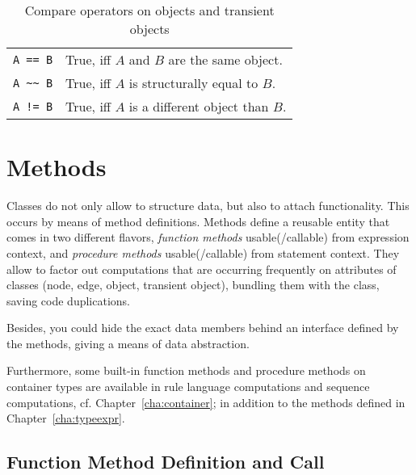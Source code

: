 \begin{table}[htbp]
  \centering
  \begin{tabularx}{\linewidth}{|l|X|}
    \hline
    \texttt{A == B} & True, iff $A$ and $B$ are the same object. \\
    \texttt{A \textasciitilde\textasciitilde\ B} & True, iff $A$ is structurally equal to $B$. \\
    \texttt{A != B} & True, iff $A$ is a different object than $B$. \\
    \hline
  \end{tabularx}
  \caption{Compare operators on objects and transient objects}
  \label{compandarithmetic}
\end{table}


\section{Methods}\label{sec:objectoriented}

Classes do not only allow to structure data, but also to attach functionality.
This occurs by means of method definitions.
Methods define a reusable entity that comes in two different flavors, \emph{function methods} usable(/callable) from expression context, and \emph{procedure methods} usable(/callable) from statement context.
They allow to factor out computations that are occurring frequently on attributes of classes (node, edge, object, transient object), bundling them with the class, saving code duplications. 

Besides, you could hide the exact data members behind an interface defined by the methods, giving a means of data abstraction.

Furthermore, some built-in function methods and procedure methods on container types are available in rule language computations and sequence computations, cf. Chapter~\ref{cha:container};
in addition to the methods defined in Chapter~\ref{cha:typeexpr}.

\subsection{Function Method Definition and Call}\label{sub:functionmethods}\label{sec:funcmethcall} 

